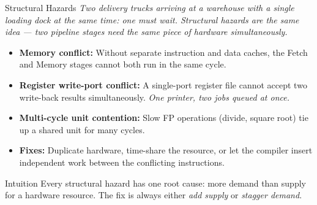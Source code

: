 \documentclass{beamer}
\begin{document}
\begin{frame}{Structural Hazards}
  \textit{Two delivery trucks arriving at a warehouse with a single loading dock
  at the same time: one must wait. Structural hazards are the same idea ---
  two pipeline stages need the same piece of hardware simultaneously.}

  \smallskip
  \begin{itemize}
    \item \textbf{Memory conflict:} Without separate instruction and data caches,
          the Fetch and Memory stages cannot both run in the same cycle.
    \item \textbf{Register write-port conflict:} A single-port register file
          cannot accept two write-back results simultaneously.
          \textit{One printer, two jobs queued at once.}
    \item \textbf{Multi-cycle unit contention:} Slow FP operations (divide,
          square root) tie up a shared unit for many cycles.
    \item \textbf{Fixes:} Duplicate hardware, time-share the resource, or
          let the compiler insert independent work between the conflicting
          instructions.
  \end{itemize}

  \begin{block}{Intuition}
    \small Every structural hazard has one root cause: more demand than supply
    for a hardware resource. The fix is always either \emph{add supply} or
    \emph{stagger demand}.
  \end{block}
\end{frame}
\end{document}
